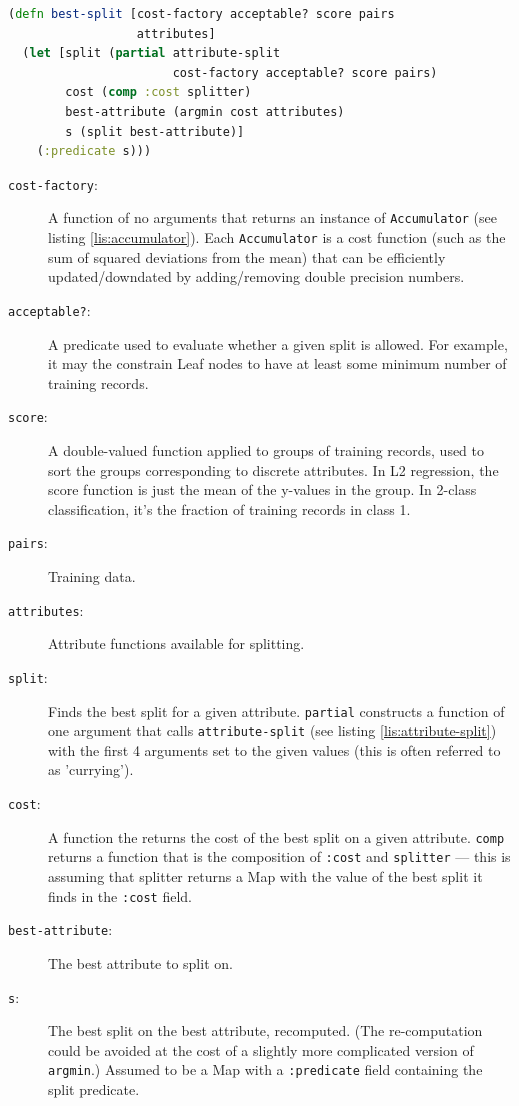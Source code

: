 \documentclass[11pt,openany,american,usenames,dvipsnames,svgnames,x11names,table,isodate]{article}
\numberwithin{equation}{section}
\numberwithin{figure}{section}
\begin{document}
\begin{minipage}[t]{1\columnwidth}%
\begin{lstlisting}[caption={Split optimization entry point},label={lis:best-split},language=clojure,tabsize=2]
(defn best-split [cost-factory acceptable? score pairs 
                  attributes]
  (let [split (partial attribute-split 
                       cost-factory acceptable? score pairs) 
        cost (comp :cost splitter)
        best-attribute (argmin cost attributes)
        s (split best-attribute)]
    (:predicate s))) 
\end{lstlisting}
%
\end{minipage}
\begin{description}
\item [{\texttt{cost-factory}:}] A function of no arguments that returns
an instance of \texttt{Accumulator} (see listing \ref{lis:accumulator}).
Each \texttt{Accumulator} is a cost function (such as the sum of squared
deviations from the mean) that can be efficiently updated/downdated
by adding/removing double precision numbers.
\item [{\texttt{acceptable?}:}] A predicate used to evaluate whether a
given split is allowed. For example, it may the constrain Leaf nodes
to have at least some minimum number of training records.
\item [{\texttt{score}:}] A double-valued function applied to groups of
training records, used to sort the groups corresponding to discrete
attributes. In L2 regression, the score function is just the mean
of the y-values in the group. In 2-class classification, it's the
fraction of training records in class 1.
\item [{\texttt{pairs}:}] Training data.
\item [{\texttt{attributes}:}] Attribute functions available for splitting.
\item [{\texttt{split}:}] Finds the best split for a given attribute. \texttt{partial}
constructs a function of one argument that calls \texttt{attribute-split}
(see listing \ref{lis:attribute-split}) with the first 4 arguments
set to the given values (this is often referred to as 'currying').
\item [{\texttt{cost}:}] A function the returns the cost of the best split
on a given attribute. \texttt{comp} returns a function that is the
composition of \texttt{:cost} and \texttt{splitter} --- this is assuming
that splitter returns a Map with the value of the best split it finds
in the \texttt{:cost} field.
\item [{\texttt{best-attribute}:}] The best attribute to split on. 
\item [{\texttt{s}:}] The best split on the best attribute, recomputed.
(The re-computation could be avoided at the cost of a slightly more
complicated version of \texttt{argmin}.) Assumed to be a Map with
a \texttt{:predicate} field containing the split predicate.\end{description}
\end{document}

